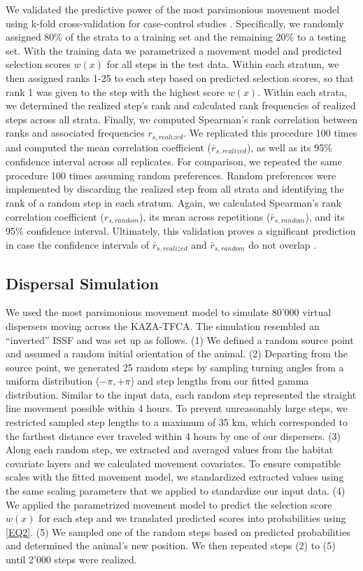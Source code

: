 \documentclass[abstract=on,10pt,a4paper,bibliography=totocnumbered]{article}
\begin{document}
We validated the predictive power of the most parsimonious movement model using
k-fold cross-validation for case-control studies \cite{Fortin.2009}.
Specifically, we randomly assigned 80\% of the strata to a training set and the
remaining 20\% to a testing set. With the training data we parametrized a
movement model and predicted selection scores \(w(x)\) for all steps in the test
data. Within each stratum, we then assigned ranks 1-25 to each step based on
predicted selection scores, so that rank 1 was given to the step with the
highest score \(w(x)\). Within each strata, we determined the realized step's
rank and calculated rank frequencies of realized steps across all strata.
Finally, we computed Spearman's rank correlation between ranks and associated
frequencies \(r_{s, realized}\). We replicated this procedure 100 times and
computed the mean correlation coefficient (\(\bar{r}_{s, realized}\)), as well
as its 95\% confidence interval across all replicates. For comparison, we
repeated the same procedure 100 times assuming random preferences. Random
preferences were implemented by discarding the realized step from all strata and
identifying the rank of a random step in each stratum. Again, we calculated
Spearman's rank correlation coefficient (\(r_{s, random}\)), its mean across
repetitions (\(\bar{r}_{s, random}\)), and its 95\% confidence interval.
Ultimately, this validation proves a significant prediction in case the
confidence intervals of \(\bar{r}_{s, realized}\) and \(\bar{r}_{s, random}\) do
not overlap \citep{Fortin.2009}.

\subsection{Dispersal Simulation}
We used the most parsimonious movement model to simulate 80'000 virtual
dispersers moving across the KAZA-TFCA. The simulation resembled an
``inverted''  ISSF and was set up as follows. (1) We defined a random source
point and assumed a random initial orientation of the animal. (2) Departing from
the source point, we generated 25 random steps by sampling turning angles from a
uniform distribution (\(-\pi, +\pi\)) and step lengths from our fitted gamma
distribution. Similar to the input data, each random step represented the
straight line movement possible within 4 hours. To prevent unreasonably large
steps, we restricted sampled step lengths to a maximum of 35 km, which
corresponded to the farthest distance ever traveled within 4 hours by one of our
dispersers. (3) Along each random step, we extracted and averaged values from
the habitat covariate layers and we calculated movement covariates. To ensure
compatible scales with the fitted movement model, we standardized extracted
values using the same scaling parameters that we applied to standardize our
input data. (4) We applied the parametrized movement model to predict the
selection score \(w(x)\) for each step and we translated predicted scores into
probabilities using \ref{EQ2}. (5) We sampled one of the random steps based on
predicted probabilities and determined the animal's new position. We then
repeated steps (2) to (5) until 2'000 steps were realized.
\end{document}

